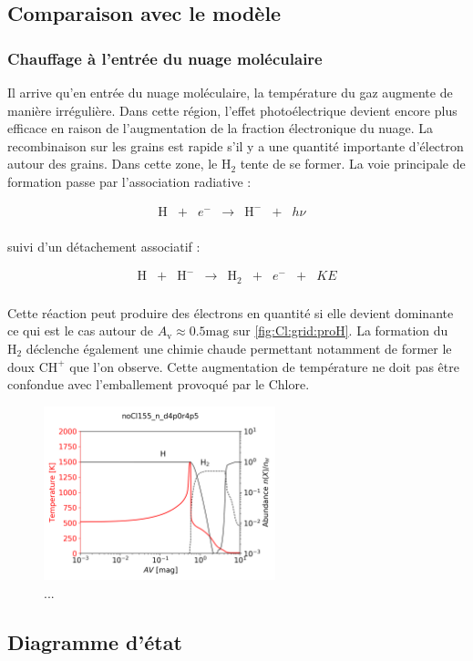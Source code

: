 
\subsection{Comparaison avec le modèle}


\subsubsection{Chauffage à l'entrée du nuage moléculaire}

Il arrive qu'en entrée du nuage moléculaire, la température du gaz augmente de manière irrégulière. Dans cette région, l'effet photoélectrique devient encore plus efficace en raison de l'augmentation de la fraction électronique du nuage. La recombinaison sur les grains est rapide s'il y a une quantité importante d'électron autour des grains. Dans cette zone, le $\mathrm{H}_2$ tente de se former. La voie principale de formation passe par l'association radiative :

\begin{equation}
    \begin{array}{lccccclr}
       \mathrm{H}  & + & e^- & \rightarrow & \mathrm{H}^{-} & + & h\nu &  \\
    \end{array}
\end{equation}

suivi d'un détachement associatif :

\begin{equation}
    \begin{array}{lcccccclr}
       \mathrm{H}  & + &  \mathrm{H}^- & \rightarrow & \mathrm{H}_2 & + & e^- & + & KE\\
    \end{array}
\end{equation}

Cette réaction peut produire des électrons en quantité si elle devient dominante ce qui est le cas autour de $A_\mathrm{v} \approx 0.5 \mathrm{mag}$ sur \autoref{fig:Cl:grid:proH}. La formation du $\mathrm{H}_2$ déclenche également une chimie chaude permettant notamment de former le doux $\mathrm{CH}^+$ que l'on observe. Cette augmentation de température ne doit pas être confondue avec l'emballement provoqué par le Chlore.


\begin{figure}[!htbp]
    \centering
        \centering \includegraphics[trim = {0 0 0 1.5cm},clip,width=0.6\textwidth]{figure/Cl/grid/profil_H.png}
        \caption{...}
    \label{fig:Cl:grid:proH}
\end{figure}

\subsection{Diagramme d'état}
